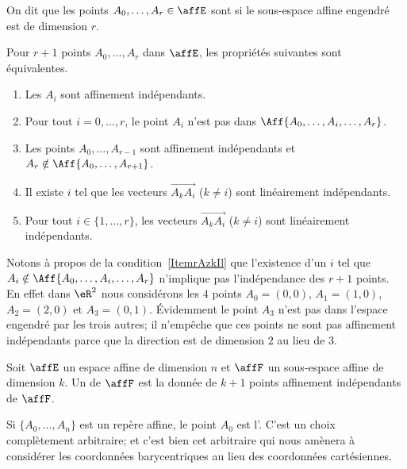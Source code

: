 \begin{definition}
	On dit que les points \( A_0,\ldots, A_r\in \affE\) sont  si le sous-espace affine engendré est de dimension \( r\).
\end{definition}

\begin{proposition}  \label{PropGAneHg}
	Pour \( r+1\) points \( A_0,\ldots, A_r\) dans \( \affE\), les propriétés suivantes sont équivalentes.
	\begin{enumerate}
		\item
		      Les \( A_i\) sont affinement indépendants.
		\item
		      Pour tout \( i=0,\ldots, r\), le point \( A_i\) n'est pas dans \( \Aff\{ A_0,\ldots, A_i,\ldots, A_r \}\).
		\item\label{ItemrAzkIl}
		      Les points \( A_0,\ldots, A_{r-1}\) sont affinement indépendants et \( A_r\notin\Aff\{ A_0,\ldots, A_{r+1} \}\).
		\item
		      Il existe \( i\) tel que les vecteurs \( \overrightarrow{ A_kA_i }\) (\( k\neq i\)) sont linéairement indépendants.
		\item\label{ItemFBfcuq}
		      Pour tout \( i\in\{ 1,\ldots, r \}\), les vecteurs \( \overrightarrow{ A_kA_i }\) (\( k\neq i\)) sont linéairement indépendants.
	\end{enumerate}
\end{proposition}

Notons à propos de la condition~\ref{ItemrAzkIl} que l'existence d'un \( i\) tel que \( A_i\notin\Aff\{ A_0,\ldots, A_i,\ldots, A_r \}\) n'implique pas l'indépendance des \( r+1\) points. En effet dans \( \eR^2\) nous considérons les \( 4\) points \( A_0=(0,0)\), \( A_1=(1,0)\), \( A_2=(2,0)\) et \( A_3=(0,1)\). Évidemment le point \( A_3\) n'est pas dans l'espace engendré par les trois autres; il n'empêche que ces points ne sont pas affinement indépendants parce que la direction est de dimension \( 2\) au lieu de \( 3\).

\begin{definition}  \label{DefguuwEO}
	Soit \( \affE\) un espace affine de dimension \( n\) et \( \affF\) un sous-espace affine de dimension \( k\). Un  de \( \affF\) est la donnée de \( k+1\) points affinement indépendants de \( \affF\).
\end{definition}
Si \( \{ A_0,\ldots, A_n \}\) est un repère affine, le point \( A_0\) est l'. C'est un choix complètement arbitraire; et c'est bien cet arbitraire qui nous amènera à considérer les coordonnées barycentriques au lieu des coordonnées cartésiennes.

